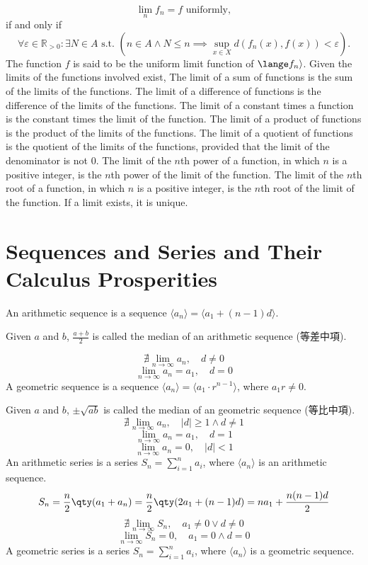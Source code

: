 \documentclass[a4paper,12pt]{report}
\begin{document}
\[\lim_nf_n=f\text{\ uniformly},\]
if and only if
\[\forall\varepsilon\in\mathbb{R}_{>0}\colon\exists N\in A\text{\ s.t.\ }\left(n\in A\land N\leq n\implies\sup_{x\in X}d(f_n(x),f(x))<\varepsilon\right).\]
The function $f$ is said to be the uniform limit function of $\lange f_n\rangle$.
Given the limits of the functions involved exist,
The limit of a sum of functions is the sum of the limits of the functions.
The limit of a difference of functions is the difference of the limits of the functions.
The limit of a constant times a function is the constant times the limit of the function.
The limit of a product of functions is the product of the limits of the functions.
The limit of a quotient of functions is the quotient of the limits of the functions, provided that the limit of the denominator is not 0.
The limit of the $n$th power of a function, in which $n$ is a positive integer, is the $n$th power of the limit of the function.
The limit of the $n$th root of a function, in which $n$ is a positive integer, is the $n$th root of the limit of the function.
If a limit exists, it is unique.



\section{Sequences and Series and Their Calculus Prosperities}
An arithmetic sequence is a sequence $\langle a_n\rangle=\langle a_1+(n-1)d\rangle$. 

Given $a$ and $b$, $\frac{a+b}{2}$ is called the median of an arithmetic sequence (等差中項).

\[\nexists\lim_{n\to\infty}a_n,\quad d\neq 0\]
\[\lim_{n\to\infty}a_n=a_1,\quad d=0\]
A geometric sequence is a sequence $\langle a_n\rangle=\langle a_1\cdot r^{n-1}\rangle$, where $a_1r\neq 0$.

Given $a$ and $b$, $\pm\sqrt{ab}$ is called the median of an geometric sequence (等比中項).
\[\nexists\lim_{n\to\infty}a_n,\quad |d|\geq 1\land d\neq 1\]
\[\lim_{n\to\infty}a_n=a_1,\quad d=1\]
\[\lim_{n\to\infty}a_n=0,\quad |d|<1\]
An arithmetic series is a series $S_n=\sum_{i=1}^na_i$, where $\langle a_n\rangle$ is an arithmetic sequence.
\[S_n=\frac{n}{2}\qty(a_1+a_n)=\frac{n}{2}\qty(2a_1+(n-1)d)=na_1+\frac{n(n-1)d}{2}\]
\[\nexists\lim_{n\to\infty}S_n,\quad a_1\neq 0\lor d\neq 0\]
\[\lim_{n\to\infty}S_n=0,\quad a_1=0\land d=0\]
A geometric series is a series $S_n=\sum_{i=1}^na_i$, where $\langle a_n\rangle$ is a geometric sequence.
\end{document}

